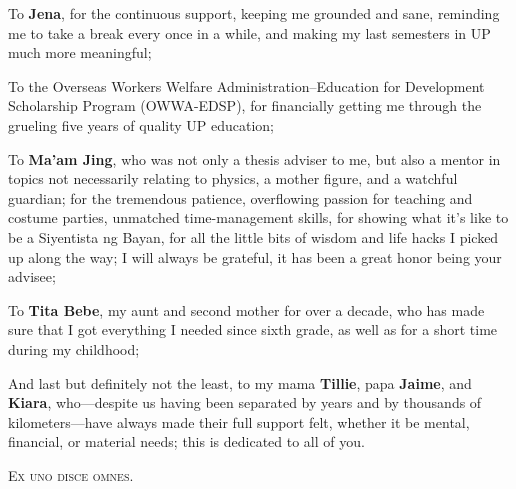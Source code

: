 To \textbf{Jena}, for the continuous support, keeping me grounded and sane, reminding me to take a break every once in a while, and making my last semesters in UP much more meaningful;

To the Overseas Workers Welfare Administration--Education for Development Scholarship Program (OWWA-EDSP), for financially getting me through the grueling five years of quality UP education;

To \textbf{Ma'am Jing}, who was not only a thesis adviser to me, but also a mentor in topics not necessarily relating to physics, a mother figure, and a watchful guardian; for the tremendous patience, overflowing passion for teaching and costume parties, unmatched time-management skills, for showing what it's like to be a Siyentista ng Bayan, for all the little bits of wisdom and life hacks I picked up along the way; I will always be grateful, it has been a great honor being your advisee;

To \textbf{Tita Bebe}, my aunt and second mother for over a decade, who has made sure that I got everything I needed since sixth grade, as well as for a short time during my childhood;

And last but definitely not the least, to my mama \textbf{Tillie}, papa \textbf{Jaime}, and \textbf{Kiara}, who---despite us having been separated by years and by thousands of kilometers---have always made their full support felt, whether it be mental, financial, or material needs; this is dedicated to all of you.

\vfill

\begin{center}
	\textsc{Ex uno disce omnes.}
\end{center}

\vfill